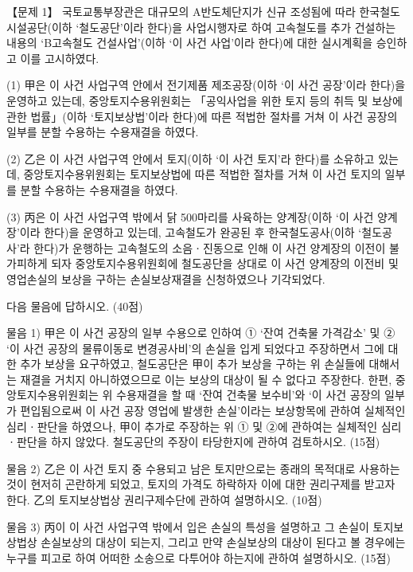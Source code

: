 \begin{longquestion}{【문제 1】}
국토교통부장관은 대규모의 A반도체단지가 신규 조성됨에 따라 한국철도시설공단(이하 ‘철도공단’이라 한다)을 사업시행자로 하여 고속철도를 추가 건설하는 내용의 ‘B고속철도 건설사업’(이하 ‘이 사건 사업’이라 한다)에 대한 실시계획을 승인하고 이를 고시하였다. \par
\medskip\noindent (1) 甲은 이 사건 사업구역 안에서 전기제품 제조공장(이하 ‘이 사건 공장’이라 한다)을 운영하고 있는데, 중앙토지수용위원회는 「공익사업을 위한 토지 등의 취득 및 보상에 관한 법률」(이하 ‘토지보상법’이라 한다)에 따른 적법한 절차를 거쳐 이 사건 공장의 일부를 분할 수용하는 수용재결을 하였다. \par
\medskip\noindent (2) 乙은 이 사건 사업구역 안에서 토지(이하 ‘이 사건 토지’라 한다)를 소유하고 있는데, 중앙토지수용위원회는 토지보상법에 따른 적법한 절차를 거쳐 이 사건 토지의 일부를 분할 수용하는 수용재결을 하였다. \par
\medskip\noindent (3) 丙은 이 사건 사업구역 밖에서 닭 500마리를 사육하는 양계장(이하 ‘이 사건 양계장’이라 한다)을 운영하고 있는데, 고속철도가 완공된 후 한국철도공사(이하 ‘철도공사’라 한다)가 운행하는 고속철도의 소음ㆍ진동으로 인해 이 사건 양계장의 이전이 불가피하게 되자 중앙토지수용위원회에 철도공단을 상대로 이 사건 양계장의 이전비 및 영업손실의 보상을 구하는 손실보상재결을 신청하였으나 기각되었다. \par
다음 물음에 답하시오. (40점) \par
\medskip\noindent 물음 1) 甲은 이 사건 공장의 일부 수용으로 인하여 ① ‘잔여 건축물 가격감소’ 및 ② ‘이 사건 공장의 물류이동로 변경공사비’의 손실을 입게 되었다고 주장하면서 그에 대한 추가 보상을 요구하였고, 철도공단은 甲이 추가 보상을 구하는 위 손실들에 대해서는 재결을 거치지 아니하였으므로 이는 보상의 대상이 될 수 없다고 주장한다. 한편, 중앙토지수용위원회는 위 수용재결을 할 때 ‘잔여 건축물 보수비’와 ‘이 사건 공장의 일부가 편입됨으로써 이 사건 공장 영업에 발생한 손실’이라는 보상항목에 관하여 실체적인 심리ㆍ판단을 하였으나, 甲이 추가로 주장하는 위 ① 및 ②에 관하여는 실체적인 심리ㆍ판단을 하지 않았다. 철도공단의 주장이 타당한지에 관하여 검토하시오. (15점) \par
\medskip\noindent 물음 2) 乙은 이 사건 토지 중 수용되고 남은 토지만으로는 종래의 목적대로 사용하는 것이 현저히 곤란하게 되었고, 토지의 가격도 하락하자 이에 대한 권리구제를 받고자 한다. 乙의 토지보상법상 권리구제수단에 관하여 설명하시오. (10점) \par
\medskip\noindent 물음 3) 丙이 이 사건 사업구역 밖에서 입은 손실의 특성을 설명하고 그 손실이 토지보상법상 손실보상의 대상이 되는지, 그리고 만약 손실보상의 대상이 된다고 볼 경우에는 누구를 피고로 하여 어떠한 소송으로 다투어야 하는지에 관하여 설명하시오. (15점) \par
\end{longquestion}
